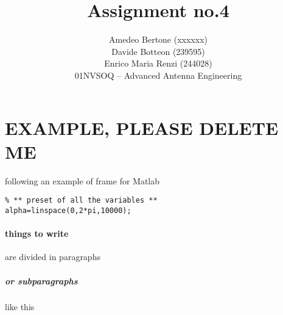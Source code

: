 \documentclass[11pt,a4paper,twoside,openright]{article}
\begin{document}
\title{Assignment no.4}
\author{Amedeo Bertone (xxxxxx)\\Davide Botteon (239595)\\Enrico Maria Renzi (244028)\\
	01NVSOQ -- Advanced Antenna Engineering}
\maketitle






\section{EXAMPLE, PLEASE DELETE ME}
following an example of frame for Matlab
\begin{lstlisting}
% ** preset of all the variables **
alpha=linspace(0,2*pi,10000);
\end{lstlisting}
\paragraph{things to write} are divided in paragraphs
\subparagraph{or subparagraphs} like this
\end{document}
